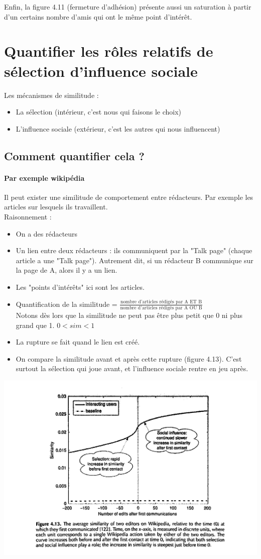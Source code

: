 Enfin, la figure 4.11 (fermeture d'adhésion) présente aussi un saturation à partir d'un certains nombre d'amis qui ont le même point d'intérêt.

\section{Quantifier les rôles relatifs de sélection d'influence sociale}
Les mécanismes de similitude :
\begin{itemize}
\item La sélection (intérieur, c'est nous qui faisons le choix)
\item L'influence sociale (extérieur, c'est les autres qui nous influencent) 
\end{itemize}
\subsection{Comment quantifier cela ?}
\paragraph*{Par exemple wikipédia}
Il peut exister une similitude de comportement entre rédacteurs. Par exemple les articles sur lesquels ils travaillent.\\
Raisonnement :
\begin{itemize}
\item On a des rédacteurs
\item Un lien entre deux rédacteurs : ils communiquent par la "Talk page" (chaque article a une "Talk page"). Autrement dit, si un rédacteur B communique sur la page de A, alors il y a un lien.
\item Les "points d'intérêts" ici sont les articles.
\item Quantification de la similitude = $\displaystyle\frac{\mbox{nombre d'articles rédigés par A ET B}}{\mbox{nombre d'articles rédigés par A OU B}}$\\
Notons dès lors que la similitude ne peut pas être plus petit que 0 ni plus grand que 1. $0 < sim < 1$
\item La rupture se fait quand le lien est créé. %
\item On compare la similitude avant et après cette rupture (figure 4.13). C'est surtout la sélection qui joue avant, et l'influence sociale rentre en jeu après.
\end{itemize}

\includegraphics[width=\textwidth]{images/21_wikipedia.jpg}